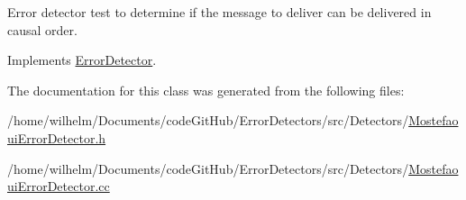 Error detector test to determine if the message to deliver can be delivered in causal order. 



Implements \hyperlink{class_error_detector_afc717d04768dd207196c08e24163115c}{Error\+Detector}.



The documentation for this class was generated from the following files\+:\begin{DoxyCompactItemize}
\item 
/home/wilhelm/\+Documents/code\+Git\+Hub/\+Error\+Detectors/src/\+Detectors/\hyperlink{_mostefaoui_error_detector_8h}{Mostefaoui\+Error\+Detector.\+h}\item 
/home/wilhelm/\+Documents/code\+Git\+Hub/\+Error\+Detectors/src/\+Detectors/\hyperlink{_mostefaoui_error_detector_8cc}{Mostefaoui\+Error\+Detector.\+cc}\end{DoxyCompactItemize}

